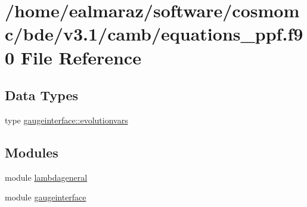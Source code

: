 \hypertarget{equations__ppf_8f90}{}\section{/home/ealmaraz/software/cosmomc/bde/v3.1/camb/equations\+\_\+ppf.f90 File Reference}
\label{equations__ppf_8f90}
\subsection*{Data Types}
\begin{DoxyCompactItemize}
\item 
type \mbox{\hyperlink{structgaugeinterface_1_1evolutionvars}{gaugeinterface\+::evolutionvars}}
\end{DoxyCompactItemize}
\subsection*{Modules}
\begin{DoxyCompactItemize}
\item 
module \mbox{\hyperlink{namespacelambdageneral}{lambdageneral}}
\item 
module \mbox{\hyperlink{namespacegaugeinterface}{gaugeinterface}}
\end{DoxyCompactItemize}
